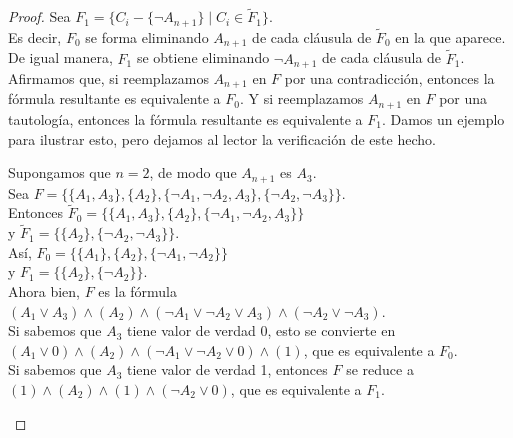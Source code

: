 \message{ !name(main.tex)}\documentclass[12pt,a4paper]{book}
\begin{document}
\begin{proof}
        Sea $F_{1}=\{C_{i}-\{\neg A_{n+1}\}\mid C_{i}\in\widetilde{F}_{1}\}$.\\
        Es decir, $F_{0}$ se forma eliminando $A_{n+1}$ de cada cláusula de $\widetilde{F}_{0}$ en la que aparece. De igual
        manera, $F_{1}$ se obtiene eliminando $\neg A_{n+1}$ de cada cláusula de $\widetilde{F}_{1}$.\\
        Afirmamos que, si reemplazamos $A_{n+1}$ en $F$ por una contradicción, entonces la fórmula resultante es equivalente
        a $F_{0}$. Y si reemplazamos $A_{n+1}$ en $F$ por una tautología, entonces la fórmula resultante es equivalente a
        $F_{1}$. Damos un ejemplo para ilustrar esto, pero dejamos al lector la verificación de este hecho.

        \begin{ejemplo}\label{ej:reduccion-atomicas}
            Supongamos que $n=2$, de modo que $A_{n+1}$ es $A_{3}$.\\
            Sea $F=\{\{A_{1},A_{3}\},\{A_{2}\},\{\neg A_{1},\neg A_{2},A_{3}\},\{\neg A_{2},\neg A_{3}\}\}$.\\
            Entonces $\widetilde{F}_{0}=\{\{A_{1},A_{3}\},\{A_{2}\},\{\neg A_{1},\neg A_{2},A_{3}\}\}$\\
            y $\widetilde{F}_{1}=\{\{A_{2}\},\{\neg A_{2},\neg A_{3}\}\}$.\\
            Así, $F_{0}=\{\{A_{1}\},\{A_{2}\},\{\neg A_{1},\neg A_{2}\}\}$\\
            y $F_{1}=\{\{A_{2}\},\{\neg A_{2}\}\}$.\\
            Ahora bien, $F$ es la fórmula $(A_{1}\vee A_{3})\wedge(A_{2})\wedge(\neg A_{1}\vee\neg A_{2}\vee A_{3})\wedge(\neg A_{2}\vee\neg A_{3})$.\\
            Si sabemos que $A_{3}$ tiene valor de verdad 0, esto se convierte en
            $(A_{1}\vee 0)\wedge(A_{2})\wedge(\neg A_{1}\vee\neg A_{2}\vee 0)\wedge(1)$, que es equivalente a $F_{0}$.\\
            Si sabemos que $A_{3}$ tiene valor de verdad 1, entonces $F$ se reduce a
            $(1)\wedge(A_{2})\wedge(1)\wedge(\neg A_{2}\vee 0)$, que es equivalente a $F_{1}$.
        \end{ejemplo}


\end{proof}
\end{document}
